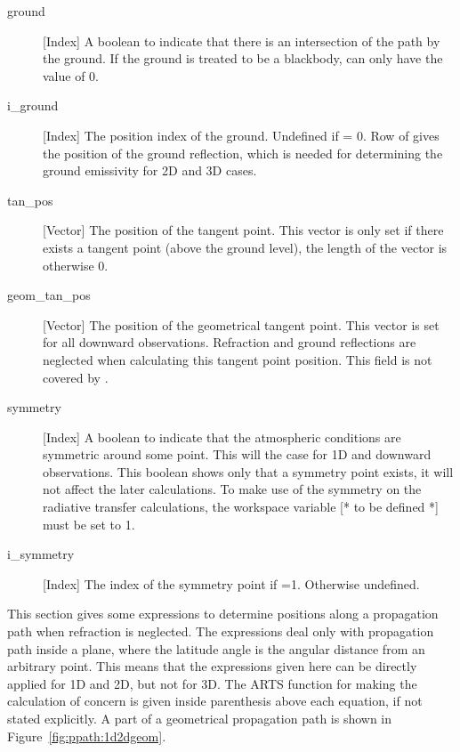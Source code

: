 \begin{description}
  \item[ground] [Index] A boolean to indicate that there is an intersection
     of the path by the ground. If the ground is treated to be a blackbody,
      can only have the value of 0.
     
   \item[i\_ground] [Index] The position index of the ground.
     Undefined if  = 0. Row  of
      gives the position of the ground reflection, which
     is needed for determining the ground emissivity for 2D and 3D cases.
     
   \item[tan\_pos] [Vector] The position of the tangent point. This
     vector is only set if there exists a tangent point (above the
     ground level), the length of the vector is otherwise 0.
     
   \item[geom\_tan\_pos] [Vector] The position of the geometrical
     tangent point. This vector is set for all downward observations.
     Refraction and ground reflections are neglected when calculating
     this tangent point position. This field is not covered by
     .
     
    \item[symmetry] [Index] A boolean to indicate that the atmospheric
      conditions are symmetric around some point. This will the case
      for 1D and downward observations. This boolean shows only that a
      symmetry point exists, it will not affect the later
      calculations.  To make use of the symmetry on the radiative
      transfer calculations, the workspace variable [* to be defined
      *] must be set to 1.

   \item[i\_symmetry] [Index] The index of the symmetry point if 
     =1. Otherwise undefined.

\end{description}




\label{sec:ppath:basicgeom}

This section gives some expressions to determine positions along a
propagation path when refraction is neglected. The expressions deal
only with propagation path inside a plane, where the latitude angle is
the angular distance from an arbitrary point. This means that the
expressions given here can be directly applied for 1D and 2D, but not for
3D. The ARTS function for making the calculation of concern is given
inside parenthesis above each equation, if not stated explicitly. A
part of a geometrical propagation path is shown in
Figure~\ref{fig:ppath:1d2dgeom}.

